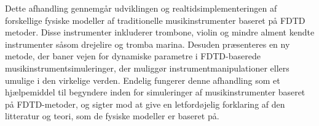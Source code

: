 Dette afhandling gennemg{\aa}r udviklingen og realtidsimplementeringen af forskellige fysiske modeller af traditionelle musikinstrumenter baseret p{\aa} FDTD metoder. Disse instrumenter inkluderer trombone, violin og mindre alment kendte instrumenter s{\aa}som drejelire og tromba marina. Desuden pr{\ae}senteres en ny metode, der baner vejen for dynamiske parametre i FDTD-baserede musikinstrumentsimuleringer, der muligg{\o}r instrumentmanipulationer ellers umulige i den virkelige verden. Endelig fungerer denne afhandling som et hj{\ae}lpemiddel til begyndere inden for simuleringer af musikinstrumenter baseret p{\aa} FDTD-metoder, og sigter mod at give en letford{\o}jelig forklaring af den litteratur og teori, som de fysiske modeller er baseret p{\aa}.
